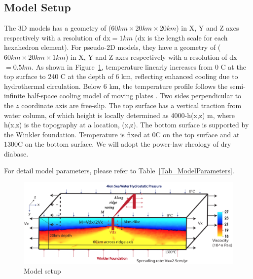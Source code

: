 \subsection{Model Setup}
The 3D models has a geometry of ($60km \times 20km \times 20km$) in X, Y and Z axes respectively with a resolution of dx$=1km$ (dx is the length scale for each hexahedron element). For pseudo-2D models, they have a geometry of ($60km \times 20km \times 1km$) in X, Y and Z axes respectively with a resolution of dx$=0.5km$. As shown in Figure~\ref{fig_Methods8_1}, temperature linearly increases from 0 \degree C at the top surface to 240 \degree C at the depth of 6 km, reflecting enhanced cooling due to hydrothermal circulation. Below 6 km, the temperature profile follows the semi-infinite half-space cooling model of moving plates \citep[e.g.,][]{Turcotte2002}. Two sides perpendicular to the $z$ coordinate axis are free-slip. The top surface has a vertical traction from water column, of which height is locally determined as 4000-h(x,z) m, where h(x,z) is the topography at a location, (x,z). The bottom surface is supported by the Winkler foundation. Temperature is fixed at 0\degree C on the top surface and at 1300\degree C on the bottom surface. We will adopt the power-law rheology of dry diabase\citep[e.g.,][]{Kirby1987, Buck2005}. 

For detail model parameters, please refer to Table~\hyperref[Tab_ModelParameters]{\ref{Tab_ModelParameters}}.

\begin{figure}[H]
 \centering
  \includegraphics[width=1.0\textwidth] {./Figures/fig_Methods8_1.png}
 \caption{\small Model setup}
 \label{fig_Methods8_1}
\end{figure}


